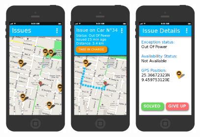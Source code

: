 \documentclass[11pt]{article} %
\begin{document}
\begin{figure}[H]
	\includegraphics[width=0.3\textwidth]{mockup/AIssues.png}
	\includegraphics[width=0.3\textwidth]{mockup/BSelectedIssue.png}
	\includegraphics[width=0.3\textwidth]{mockup/CIssueDetail.png}
\end{figure}
  
\end{document}
